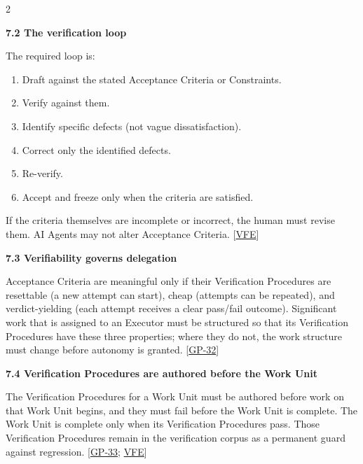 \begin{multicols}{2}
\hypertarget{nss-7.2}{}

\par\smallskip\noindent\textbf{7.2 The verification loop}\par\nopagebreak

The required loop is:

\begin{enumerate}\setlength{\itemsep}{0pt}\setlength{\parskip}{0pt}

\item Draft against the stated Acceptance Criteria or Constraints.

\item Verify against them.

\item Identify specific defects (not vague dissatisfaction).

\item Correct only the identified defects.

\item Re-verify.

\item Accept and freeze only when the criteria are satisfied.

\end{enumerate}

If the criteria themselves are incomplete or incorrect, the human must revise them. AI Agents may not alter Acceptance Criteria. [\hyperlink{gp-VFE}{VFE}]

\hypertarget{nss-7.3}{}

\par\smallskip\noindent\textbf{7.3 Verifiability governs delegation}\par\nopagebreak

Acceptance Criteria are meaningful only if their Verification Procedures are resettable (a new attempt can start), cheap (attempts can be repeated), and verdict-yielding (each attempt receives a clear pass/fail outcome). Significant work that is assigned to an Executor must be structured so that its Verification Procedures have these three properties; where they do not, the work structure must change before autonomy is granted. [\hyperlink{gp-32}{GP-32}]

\hypertarget{nss-7.4}{}

\par\smallskip\noindent\textbf{7.4 Verification Procedures are authored before the Work Unit}\par\nopagebreak

The Verification Procedures for a Work Unit must be authored before work on that Work Unit begins, and they must fail before the Work Unit is complete. The Work Unit is complete only when its Verification Procedures pass. Those Verification Procedures remain in the verification corpus as a permanent guard against regression. [\hyperlink{gp-33}{GP-33}; \hyperlink{gp-VFE}{VFE}]


\end{multicols}
